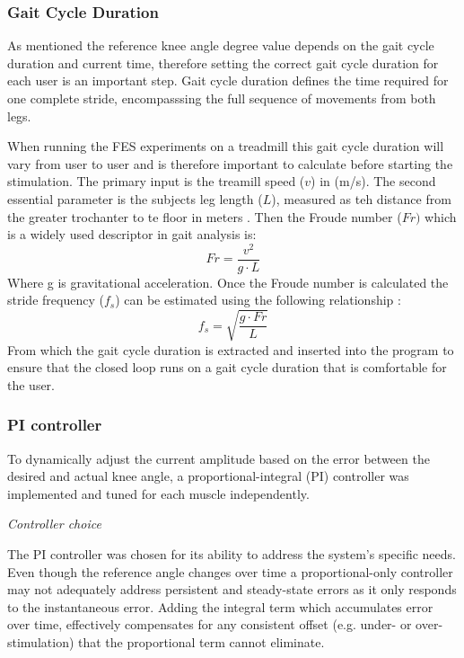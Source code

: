 \subsubsection{Gait Cycle Duration}
As mentioned the reference knee angle degree value depends on the gait cycle duration and current time, therefore setting the correct gait cycle duration for each user is an important step. Gait cycle duration defines the time required for one complete stride, encompasssing the full sequence of movements from both legs. 

When running the FES experiments on a treadmill this gait cycle duration will vary from user to user and is therefore important to calculate before starting the stimulation. The primary input is the treamill speed (\(v\)) in (m/s). The second essential parameter is the subjects leg length (\(L\)), measured as teh distance from the greater trochanter to te floor in meters . Then the Froude number (\(Fr)\) which is a widely used descriptor in gait analysis is:
\begin{equation}
    Fr = \frac{v^2}{g \cdot L}
\end{equation}
Where g is gravitational acceleration. Once the Froude number is calculated the stride frequency (\(f_s\)) can be estimated using the following relationship :
\begin{equation}
    f_s = \sqrt{\frac{g \cdot Fr}{L}}
\end{equation}
From which the gait cycle duration is extracted and inserted into the program to ensure that the closed loop runs on a gait cycle duration that is comfortable for the user.


\subsubsection{PI controller}
To dynamically adjust the current amplitude based on the error between the desired and actual knee angle, a proportional-integral (PI) controller was implemented and tuned for each muscle independently. 
\newline

\textit{Controller choice}

The PI controller was chosen for its ability to address the system's specific needs.  Even though the reference angle changes over time a proportional-only controller may not adequately address persistent and steady-state errors as it only responds to the instantaneous error. Adding the integral term which accumulates error over time, effectively compensates for any consistent offset (e.g. under- or over-stimulation) that the proportional term cannot eliminate. 

